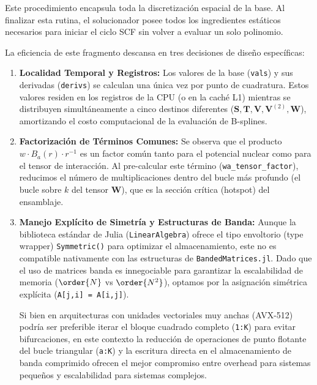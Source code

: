 Este procedimiento encapsula toda la discretización espacial de la base. Al finalizar esta rutina, el solucionador posee todos los ingredientes estáticos necesarios para iniciar el ciclo SCF sin volver a evaluar un solo polinomio.

La eficiencia de este fragmento descansa en tres decisiones de diseño específicas:

\begin{enumerate}
    \item \textbf{Localidad Temporal y Registros:} Los valores de la base (\texttt{vals}) y sus derivadas (\texttt{derivs}) se calculan una única vez por punto de cuadratura. Estos valores residen en los registros de la CPU (o en la caché L1) mientras se distribuyen simultáneamente a cinco destinos diferentes (\(\mathbf{S}, \mathbf{T}, \mathbf{V}, \mathbf{V}^{(2)}, \mathbf{W}\)), amortizando el costo computacional de la evaluación de B-splines.
    
    \item \textbf{Factorización de Términos Comunes:} Se observa que el producto \( w \cdot B_a(r) \cdot r^{-1} \) es un factor común tanto para el potencial nuclear como para el tensor de interacción. Al pre-calcular este término (\texttt{wa\_tensor\_factor}), reducimos el número de multiplicaciones dentro del bucle más profundo (el bucle sobre \( k \) del tensor \(\mathbf{W}\)), que es la sección crítica (hotspot) del ensamblaje.
    
    \item \textbf{Manejo Explícito de Simetría y Estructuras de Banda:} 
    Aunque la biblioteca estándar de Julia (\texttt{LinearAlgebra}) ofrece el tipo envoltorio (type wrapper) \texttt{Symmetric()} para optimizar el almacenamiento, este no es compatible nativamente con las estructuras de \texttt{BandedMatrices.jl}. Dado que el uso de matrices banda es innegociable para garantizar la escalabilidad de memoria (\(\order{N}\) vs \(\order{N^2}\)), optamos por la asignación simétrica explícita (\texttt{A[j,i] = A[i,j]}). 
    
    Si bien en arquitecturas con unidades vectoriales muy anchas (AVX-512) podría ser preferible iterar el bloque cuadrado completo (\texttt{1:K}) para evitar bifurcaciones, en este contexto la reducción de operaciones de punto flotante del bucle triangular (\texttt{a:K}) y la escritura directa en el almacenamiento de banda comprimido ofrecen el mejor compromiso entre overhead para sistemas pequeños y escalabilidad para sistemas complejos.
\end{enumerate}

